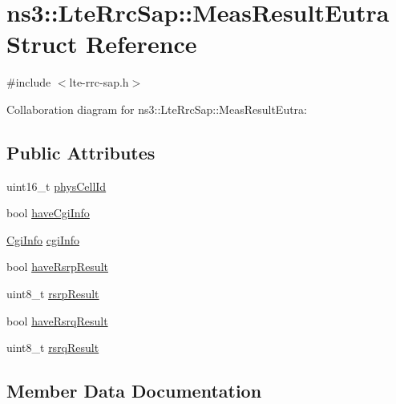 \hypertarget{structns3_1_1LteRrcSap_1_1MeasResultEutra}{}\section{ns3\+:\+:Lte\+Rrc\+Sap\+:\+:Meas\+Result\+Eutra Struct Reference}
\label{structns3_1_1LteRrcSap_1_1MeasResultEutra}


{\ttfamily \#include $<$lte-\/rrc-\/sap.\+h$>$}



Collaboration diagram for ns3\+:\+:Lte\+Rrc\+Sap\+:\+:Meas\+Result\+Eutra\+:
\subsection*{Public Attributes}
\begin{DoxyCompactItemize}
\item 
uint16\+\_\+t \hyperlink{structns3_1_1LteRrcSap_1_1MeasResultEutra_a8b78981481aaf789be9cbf77caf87c7c}{phys\+Cell\+Id}
\item 
bool \hyperlink{structns3_1_1LteRrcSap_1_1MeasResultEutra_ab605d555b4358e42fd56a67e88c203e3}{have\+Cgi\+Info}
\item 
\hyperlink{structns3_1_1LteRrcSap_1_1CgiInfo}{Cgi\+Info} \hyperlink{structns3_1_1LteRrcSap_1_1MeasResultEutra_a9ce8dff958c28eec9f3ae71c6d54f6bb}{cgi\+Info}
\item 
bool \hyperlink{structns3_1_1LteRrcSap_1_1MeasResultEutra_a518b7b998a4949d9745c1036ce96e173}{have\+Rsrp\+Result}
\item 
uint8\+\_\+t \hyperlink{structns3_1_1LteRrcSap_1_1MeasResultEutra_a26bb10f458fef3bc865039286c20b358}{rsrp\+Result}
\item 
bool \hyperlink{structns3_1_1LteRrcSap_1_1MeasResultEutra_a66d5a7e680b1d9477bb6686c08e22b92}{have\+Rsrq\+Result}
\item 
uint8\+\_\+t \hyperlink{structns3_1_1LteRrcSap_1_1MeasResultEutra_a18e766d203146f783accd739eab2544f}{rsrq\+Result}
\end{DoxyCompactItemize}


\subsection{Member Data Documentation}
